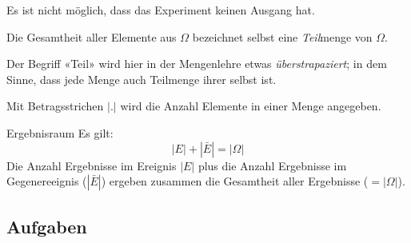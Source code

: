 Es ist nicht möglich, dass das Experiment keinen Ausgang hat.


\begin{bemerkung}{}{}
Die Gesamtheit aller Elemente aus $\Omega$ bezeichnet selbst eine
\textit{Teil}menge von $\Omega$.

Der Begriff «Teil» wird hier in der Mengenlehre etwas \textit{überstrapaziert}; in dem Sinne, dass jede Menge auch
  Teilmenge ihrer selbst ist.
\end{bemerkung}

\begin{definition}{}{}
Mit Betragsstrichen $|.|$ wird die Anzahl Elemente in einer Menge angegeben.
\end{definition}

\begin{bemerkung}{Ergebnisraum}{}
  Es gilt: $$|E| + |{\bar{E}}| = |\Omega|$$
  Die Anzahl Ergebnisse im Ereignis $|E|$ plus die Anzahl Ergebnisse im Gegenereeignis ($|\bar{E}|$) ergeben zusammen die Gesamtheit aller Ergebnisse ($=|\Omega|$).
\end{bemerkung}

\subsection*{Aufgaben}

\newpage
